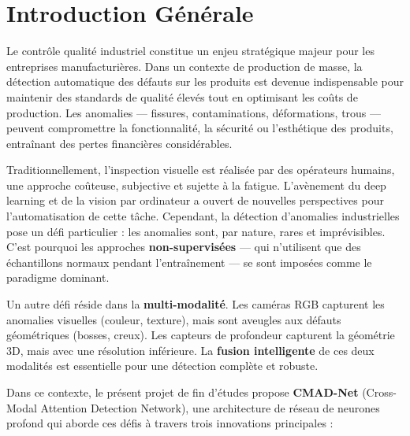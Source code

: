 \documentclass[12pt,a4paper,oneside]{report}
\newcommand{\cmadnet}{\textbf{CMAD-Net}}
\begin{document}
\tableofcontents
\listoffigures
{}
\listoftables
{}

\newpage
{}

\chapter*{Introduction Générale}

Le contrôle qualité industriel constitue un enjeu stratégique majeur pour les entreprises manufacturières. Dans un contexte de production de masse, la détection automatique des défauts sur les produits est devenue indispensable pour maintenir des standards de qualité élevés tout en optimisant les coûts de production. Les anomalies --- fissures, contaminations, déformations, trous --- peuvent compromettre la fonctionnalité, la sécurité ou l'esthétique des produits, entraînant des pertes financières considérables.

Traditionnellement, l'inspection visuelle est réalisée par des opérateurs humains, une approche coûteuse, subjective et sujette à la fatigue. L'avènement du deep learning et de la vision par ordinateur a ouvert de nouvelles perspectives pour l'automatisation de cette tâche. Cependant, la détection d'anomalies industrielles pose un défi particulier : les anomalies sont, par nature, rares et imprévisibles. C'est pourquoi les approches \textbf{non-supervisées} --- qui n'utilisent que des échantillons normaux pendant l'entraînement --- se sont imposées comme le paradigme dominant.

Un autre défi réside dans la \textbf{multi-modalité}. Les caméras RGB capturent les anomalies visuelles (couleur, texture), mais sont aveugles aux défauts géométriques (bosses, creux). Les capteurs de profondeur capturent la géométrie 3D, mais avec une résolution inférieure. La \textbf{fusion intelligente} de ces deux modalités est essentielle pour une détection complète et robuste.

Dans ce contexte, le présent projet de fin d'études propose \cmadnet{} (Cross-Modal Attention Detection Network), une architecture de réseau de neurones profond qui aborde ces défis à travers trois innovations principales :
\end{document}
